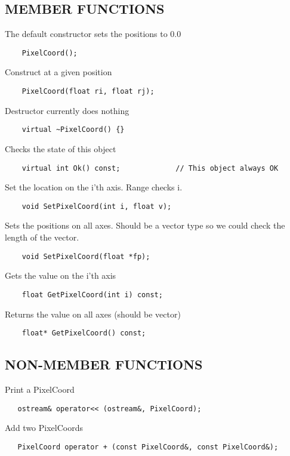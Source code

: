 \subsection*{MEMBER FUNCTIONS}
     The default constructor sets the positions to 0.0
\begin{verbatim}
    PixelCoord();
\end{verbatim}

     Construct at a given position
\begin{verbatim}
    PixelCoord(float ri, float rj);
\end{verbatim}

     Destructor currently does nothing
\begin{verbatim}
    virtual ~PixelCoord() {}
\end{verbatim}

     Checks the state of this object
\begin{verbatim}
    virtual int Ok() const;             // This object always OK
\end{verbatim}

     Set the location on the i'th axis. Range checks i.
\begin{verbatim}
    void SetPixelCoord(int i, float v);
\end{verbatim}

     Sets the positions on all axes. Should be a vector type so
     we could check the length of the vector.
\begin{verbatim}
    void SetPixelCoord(float *fp);
\end{verbatim}    

     Gets the value on the i'th axis
\begin{verbatim}
    float GetPixelCoord(int i) const;
\end{verbatim}

     Returns the value on all axes (should be vector)
\begin{verbatim}
    float* GetPixelCoord() const;
\end{verbatim}

\subsection*{NON-MEMBER FUNCTIONS}

 Print a PixelCoord
\begin{verbatim}
   ostream& operator<< (ostream&, PixelCoord);
\end{verbatim}

 Add two PixelCoords
\begin{verbatim}
   PixelCoord operator + (const PixelCoord&, const PixelCoord&);
\end{verbatim}

